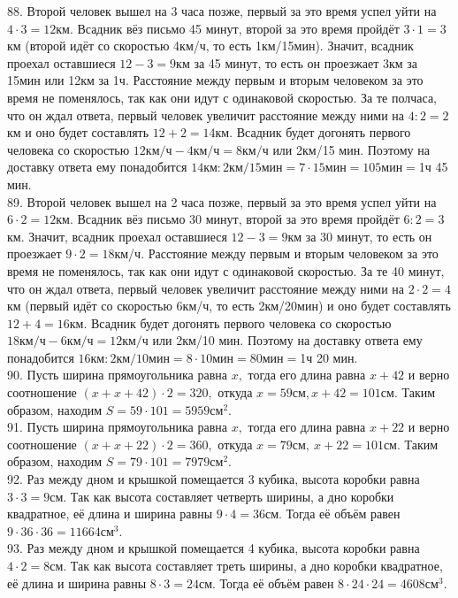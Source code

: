 \documentclass[12pt]{article}
\begin{document}
88. Второй человек вышел на 3 часа позже, первый за это время успел уйти на $4\cdot3=12$км. Всадник вёз письмо 45 минут, второй за это время пройдёт $3\cdot1=3$км (второй идёт со скоростью 4км/ч, то есть 1км/15мин). Значит, всадник проехал оставшиеся $12-3=9$км за 45 минут, то есть он проезжает 3км за 15мин или 12км за 1ч. Расстояние между первым и вторым человеком за это время не поменялось, так как они идут с одинаковой скоростью. За те полчаса, что он ждал ответа, первый человек увеличит расстояние между ними на $4:2=2$км и оно будет составлять $12+2=14$км. Всадник будет догонять первого человека со скоростью $12\text{км/ч}-4\text{км/ч}=8\text{км/ч}$ или 2км/15 мин. Поэтому на доставку ответа ему понадобится $14\text{км}:2\text{км/15мин}=7\cdot15\text{мин}=105\text{мин}=$1ч 45 мин.\\
89. Второй человек вышел на 2 часа позже, первый за это время успел уйти на $6\cdot2=12$км. Всадник вёз письмо 30 минут, второй за это время пройдёт $6:2=3$км. Значит, всадник проехал оставшиеся $12-3=9$км за 30 минут, то есть он проезжает $9\cdot2=18$км/ч. Расстояние между первым и вторым человеком за это время не поменялось, так как они идут с одинаковой скоростью. За те 40 минут, что он ждал ответа, первый человек увеличит расстояние между ними на $2\cdot2=4$км (первый идёт со скоростью 6км/ч, то есть 2км/20мин) и оно будет составлять $12+4=16$км. Всадник будет догонять первого человека со скоростью $18\text{км/ч}-6\text{км/ч}=12\text{км/ч}$ или 2км/10 мин. Поэтому на доставку ответа ему понадобится $16\text{км}:2\text{км/10мин}=8\cdot10\text{мин}=80\text{мин}=$1ч 20 мин.\\
90. Пусть ширина прямоугольника равна $x,$ тогда его длина равна $x+42$ и верно соотношение $(x+x+42)\cdot2=320,$ откуда $x=59\text{см}, x+42=101\text{см}.$ Таким образом, находим
$S=59\cdot101=5959\text{см}^2.$\\
91. Пусть ширина прямоугольника равна $x,$ тогда его длина равна $x+22$ и верно соотношение $(x+x+22)\cdot2=360,$ откуда $x=79\text{см},\ x+22=101\text{см}.$ Таким образом, находим
$S=79\cdot101=7979\text{см}^2.$\\
92. Раз между дном и крышкой помещается 3 кубика, высота коробки равна $3\cdot3=9$см. Так как высота составляет четверть ширины, а дно коробки квадратное, её длина и ширина равны $9\cdot4=36$см. Тогда её объём равен $9\cdot36\cdot36=11664\text{см}^3.$\\
93. Раз между дном и крышкой помещается 4 кубика, высота коробки равна $4\cdot2=8$см. Так как высота составляет треть ширины, а дно коробки квадратное, её длина и ширина равны $8\cdot3=24$см. Тогда её объём равен $8\cdot24\cdot24=4608\text{см}^3.$\\
\end{document}
